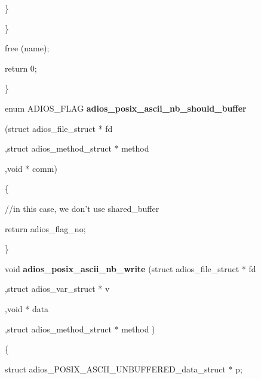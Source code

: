 \vspace{10pt}
\parindent=72pt
\}

\vspace{10pt}
\parindent=14pt
\}

\vspace{10pt}
free (name);

\vspace{10pt}
\parindent=28pt
return 0;

\vspace{10pt}
\parindent=0pt
\}

\vspace{23pt}
enum ADIOS\_FLAG {\color{color02} \textbf{adios\_posix\_ascii\_nb\_should\_buffer}}{\color{color02}  
}

\vspace{10pt}
\parindent=205pt
{\color{color02} (struct adios\_file\_struct * fd}

\vspace{10pt}
{\color{color02} ,struct adios\_method\_struct * method}

\vspace{10pt}
\parindent=410pt
{\color{color02} ,void * comm) }

\vspace{10pt}
\parindent=0pt
\{

\vspace{10pt}
\parindent=14pt
//in this case, we don't use shared\_buffer

\vspace{10pt}
return adios\_flag\_no;

\vspace{10pt}
\parindent=0pt
\}

\vspace{23pt}
void {\color{color02} \textbf{adios\_posix\_ascii\_nb\_write}} (struct adios\_file\_struct 
* fd

\vspace{10pt}
\parindent=158pt
,struct adios\_var\_struct * v 

\vspace{10pt}
,void * data

\vspace{10pt}
\parindent=316pt
,struct adios\_method\_struct * method ) 

\vspace{10pt}
\parindent=0pt
\{

\vspace{10pt}
\parindent=14pt
struct adios\_POSIX\_ASCII\_UNBUFFERED\_data\_struct * p;

